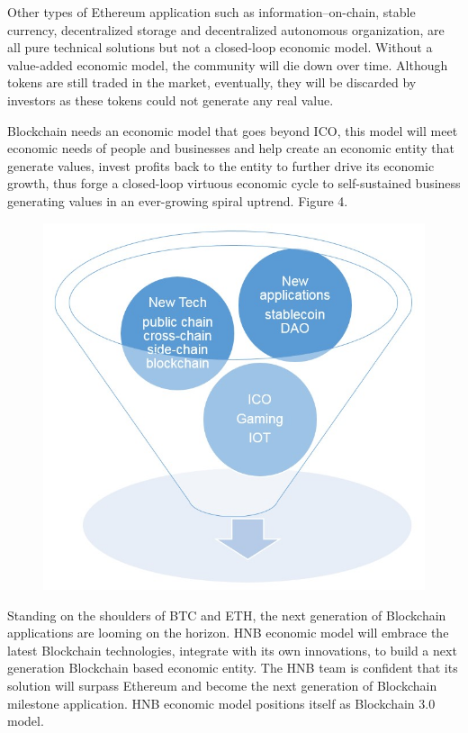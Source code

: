 \documentclass[fleqn,10pt]{SelfArx} %
\begin{document}
Other types of Ethereum application such as information--on-chain, stable currency, decentralized storage and decentralized autonomous organization, are all pure technical solutions but not a closed-loop economic model. Without a value-added economic model, the community will die down over time. Although tokens are still traded in the market, eventually, they will be discarded by investors as these tokens could not generate any real value. 

Blockchain needs an economic model that goes beyond ICO, this model will meet economic needs of people and businesses and help create an economic entity that generate values, invest profits back to the entity to further drive its economic growth, thus forge a closed-loop virtuous economic cycle to self-sustained business generating values in an ever-growing spiral uptrend. Figure 4.\\

\begin{figure}[ht]\centering
\includegraphics[width=\linewidth]{4}
\caption{}
\label{4}
\end{figure}


Standing on the shoulders of BTC and ETH, the next generation of Blockchain applications are looming on the horizon. HNB economic model will embrace the latest Blockchain technologies, integrate with its own innovations, to build a next generation Blockchain based economic entity. The HNB team is confident that its solution will surpass Ethereum and become the next generation of Blockchain milestone application. HNB economic model positions itself as Blockchain 3.0 model.
\end{document}
